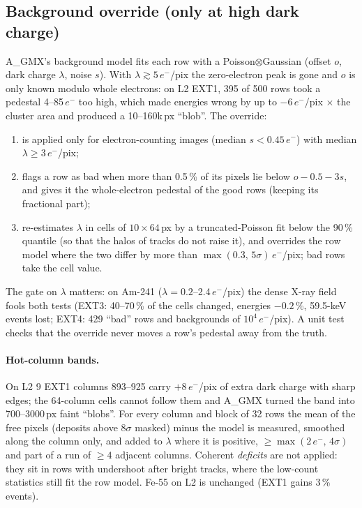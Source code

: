 \documentclass[11pt,a4paper]{article}
\newcommand{\el}{\ensuremath{e^-}}
\newcommand{\AGMX}{A\_GMX}
\begin{document}
\subsection{Background override (only at high dark charge)}
\AGMX's background model fits each row with a Poisson$\otimes$Gaussian (offset $o$, dark charge $\lambda$, noise $s$). With
$\lambda\gtrsim5$\,\el/pix the zero-electron peak is gone and $o$ is only known modulo whole electrons: on L2 EXT1, 395 of 500
rows took a pedestal 4--85\,\el{} too high, which made energies wrong by up to $-6$\,\el/pix $\times$ the cluster area and
produced a 10--160k\,px ``blob''. The override:
\begin{enumerate}
\item is applied only for electron-counting images (median $s<0.45$\,\el) with median $\lambda\ge3$\,\el/pix;
\item flags a row as bad when more than 0.5\,\% of its pixels lie below $o-0.5-3s$, and gives it the whole-electron
pedestal of the good rows (keeping its fractional part);
\item re-estimates $\lambda$ in cells of $10\times64$\,px by a truncated-Poisson fit below the 90\,\% quantile (so that the
halos of tracks do not raise it), and overrides the row model where the two differ by more than
$\max(0.3,\,5\sigma)$\,\el/pix; bad rows take the cell value.
\end{enumerate}
The gate on $\lambda$ matters: on Am-241 ($\lambda=0.2$--2.4\,\el/pix) the dense X-ray field fools both tests (EXT3: 40--70\,\%
of the cells changed, energies $-0.2$\,\%, 59.5-keV events lost; EXT4: 429 ``bad'' rows and backgrounds of $10^4$\,\el/pix).
A unit test checks that the override never moves a row's pedestal away from the truth.

\paragraph{Hot-column bands.} On L2 9 EXT1 columns 893--925 carry $+8$\,\el/pix of extra dark charge with sharp edges;
the 64-column cells cannot follow them and \AGMX{} turned the band into 700--3000\,px faint ``blobs''. For every column and
block of 32 rows the mean of the free pixels (deposits above $8\sigma$ masked) minus the model is measured, smoothed along
the column only, and added to $\lambda$ where it is positive, $\ge\max(2\,\el,\,4\sigma)$ and part of a run of $\ge4$ adjacent
columns. Coherent \emph{deficits} are not applied: they sit in rows with undershoot after bright tracks, where the
low-count statistics still fit the row model. Fe-55 on L2 is unchanged (EXT1 gains 3\,\% events).
\end{document}
